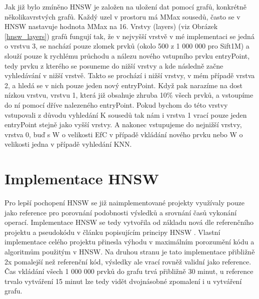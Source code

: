 \documentclass[czech,semestral,dept460,male,csharp,cpdeclaration]{diploma}
\begin{document}
		Jak již bylo zmíněno HNSW je založen na uložení dat pomocí grafů, konkrétně několikavrstvých grafů. Každý uzel v prostoru má MMax sousedů, často se v HNSW nastavuje hodnota MMax na 16. Vrstvy (layers) (viz Obrázek \ref{hnsw_layers}) grafů fungují tak, že v nejvyšší vrstvě v mé implementaci se jedná o vrstvu 3, se nachází pouze zlomek prvků (okolo 500 z 1 000 000 pro Sift1M) a slouží pouze k rychlému průchodu a nálezu nového vstupního prvku entryPoint, tedy prvku z kterého se posuneme do nižší vrstvy a kde následně začne vyhledávání v nižší vrstvě. Takto se prochází i nižší vrstvy, v mém případě vrstva 2, a hledá se v nich pouze jeden nový entryPoint. Když pak narazíme na dost nízkou vrstvu, vrstvu 1, která již obsahuje zhruba 10\% všech prvků, a vstoupíme do ní pomocí dříve nalezeného entryPoint. Pokud bychom do této vrstvy vstupovali z důvodu vyhledání K sousedů tak nám i vrstva 1 vrací pouze jeden entryPoint stejně jako vyšší vrstvy. A nakonec vstupujeme do nejnižší vrstvy, vrstva 0, buď s W o velikosti EfC v případě vkládání nového prvku nebo W o velikosti jedna v případě vyhledání KNN.
		
		\section{Implementace HNSW}
		
		Pro lepší pochopení HNSW se již naimplementované projekty \cite{git-hnswlib} \cite{git-hnsw} využívaly pouze jako reference pro porovnání podobnosti výsledků a srovnání časů vykonání operací. Implementace HNSW se tedy vytvořila od základu nová dle referenčního projektu a pseudokódu v článku popisujícím principy HNSW \cite{malkov2018efficient}. Vlastní implementace celého projektu přinesla výhodu v maximálním porozumění kódu a algoritmům použitým v HNSW. Na druhou stranu je tato implementace přibližně 2x pomalejší než referenční kód, výsledky ale vrací rovněž validní jako reference. Čas vkládání všech 1 000 000 prvků do grafu trvá přibližně 30 minut, u reference trvalo vytváření 15 minut lze tedy vidět dvojnásobné zpomalení i u vytváření grafu.
		
\end{document}
